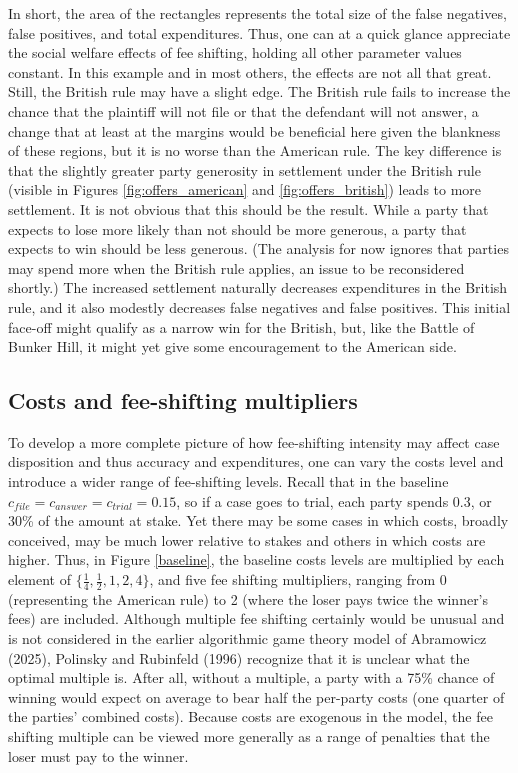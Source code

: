 \documentclass{article}
\begin{document}
In short, the area of the rectangles represents the total size of the false negatives, false positives, and total expenditures. Thus, one can at a quick glance appreciate the social welfare effects of fee shifting, holding all other parameter values constant. In this example and in most others, the effects are not all that great. Still, the British rule may have a slight edge. The British rule fails to increase the chance that the plaintiff will not file or that the defendant will not answer, a change that at least at the margins would be beneficial here given the blankness of these regions, but it is no worse than the American rule. The key difference is that the slightly greater party generosity in settlement under the British rule (visible in Figures \ref{fig:offers_american} and \ref{fig:offers_british}) leads to more settlement. It is not obvious that this should be the result. While a party that expects to lose more likely than not should be more generous, a party that expects to win should be less generous. (The analysis for now ignores that parties may spend more when the British rule applies, an issue to be reconsidered shortly.) The increased settlement naturally decreases expenditures in the British rule, and it also modestly decreases false negatives and false positives. This initial face-off might qualify as a narrow win for the British, but, like the Battle of Bunker Hill, it might yet give some encouragement to the American side. 

\subsection{Costs and fee-shifting multipliers}

To develop a more complete picture of how fee-shifting intensity may affect case disposition and thus accuracy and expenditures, one can vary the costs level and introduce a wider range of fee-shifting levels. Recall that in the baseline $c_{file}=c_{answer}=c_{trial}=0.15$, so if a case goes to trial, each party spends 0.3, or 30\% of the amount at stake. Yet there may be some cases in which costs, broadly conceived, may be much lower relative to stakes and others in which costs are higher. Thus, in Figure \ref{baseline}, the baseline costs levels are multiplied by each element of $\{\frac{1}{4}, \frac{1}{2}, 1, 2, 4\}$, and five fee shifting multipliers, ranging from 0 (representing the American rule) to 2 (where the loser pays twice the winner's fees) are included. Although multiple fee shifting certainly would be unusual and is not considered in the earlier algorithmic game theory model of Abramowicz (2025), Polinsky and Rubinfeld (1996) \cite{polinskyrubinfeld1996} recognize that it is unclear what the optimal multiple is. After all, without a multiple, a party with a 75\% chance of winning would expect on average to bear half the per-party costs (one quarter of the parties' combined costs). Because costs are exogenous in the model, the fee shifting multiple can be viewed more generally as a range of penalties that the loser must pay to the winner.
\end{document}
